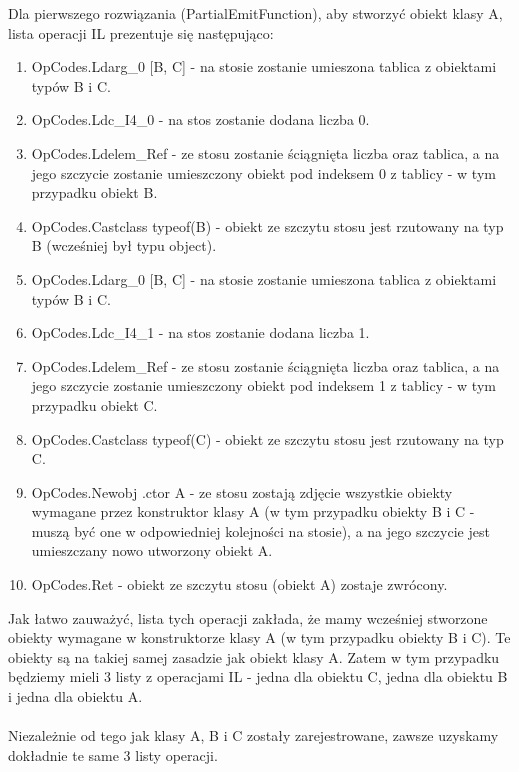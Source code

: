 \documentclass[12pt]{article}
\begin{document}
Dla pierwszego rozwiązania (PartialEmitFunction), aby stworzyć obiekt klasy A, lista operacji IL prezentuje się następująco:
\begin{enumerate}
	\item OpCodes.Ldarg\_0 [B, C] - na stosie zostanie umieszona tablica z obiektami typów B i C.
	\item OpCodes.Ldc\_I4\_0 - na stos zostanie dodana liczba 0.
	\item OpCodes.Ldelem\_Ref - ze stosu zostanie ściągnięta liczba oraz tablica, a na jego szczycie zostanie umieszczony obiekt pod indeksem 0 z tablicy - w tym przypadku obiekt B.
	\item OpCodes.Castclass typeof(B) - obiekt ze szczytu stosu jest rzutowany na typ B (wcześniej był typu object).
	\item OpCodes.Ldarg\_0 [B, C] - na stosie zostanie umieszona tablica z obiektami typów B i C.
	\item OpCodes.Ldc\_I4\_1 - na stos zostanie dodana liczba 1.
	\item OpCodes.Ldelem\_Ref - ze stosu zostanie ściągnięta liczba oraz tablica, a na jego szczycie zostanie umieszczony obiekt pod indeksem 1 z tablicy - w tym przypadku obiekt C.
	\item OpCodes.Castclass typeof(C) - obiekt ze szczytu stosu jest rzutowany na typ C.
	\item OpCodes.Newobj .ctor A - ze stosu zostają zdjęcie wszystkie obiekty wymagane przez konstruktor klasy A (w tym przypadku obiekty B i C - muszą być one w odpowiedniej kolejności na stosie), a na jego szczycie jest umieszczany nowo utworzony obiekt A.
	\item OpCodes.Ret - obiekt ze szczytu stosu (obiekt A) zostaje zwrócony.
\end{enumerate}
Jak łatwo zauważyć, lista tych operacji zakłada, że mamy wcześniej stworzone obiekty wymagane w konstruktorze klasy A (w tym przypadku obiekty B i C). Te obiekty są na takiej samej zasadzie jak obiekt klasy A. Zatem w tym przypadku będziemy mieli 3 listy z operacjami IL - jedna dla obiektu C, jedna dla obiektu B i jedna dla obiektu A.\\
\\
Niezależnie od tego jak klasy A, B i C zostały zarejestrowane, zawsze uzyskamy dokładnie te same 3 listy operacji.\\
\end{document}

